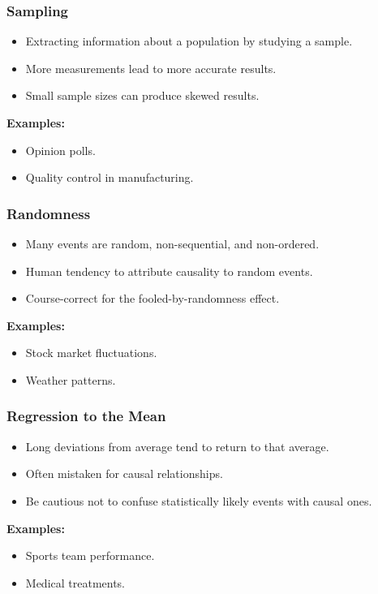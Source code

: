 \begin{frame}[fragile]\frametitle{Sampling}
\begin{itemize}
    \item Extracting information about a population by studying a sample.
    \item More measurements lead to more accurate results.
    \item Small sample sizes can produce skewed results.
\end{itemize}
\textbf{Examples:}
\begin{itemize}
    \item Opinion polls.
    \item Quality control in manufacturing.
\end{itemize}
\end{frame}

\begin{frame}[fragile]\frametitle{Randomness}
\begin{itemize}
    \item Many events are random, non-sequential, and non-ordered.
    \item Human tendency to attribute causality to random events.
    \item Course-correct for the fooled-by-randomness effect.
\end{itemize}
\textbf{Examples:}
\begin{itemize}
    \item Stock market fluctuations.
    \item Weather patterns.
\end{itemize}
\end{frame}

\begin{frame}[fragile]\frametitle{Regression to the Mean}
\begin{itemize}
    \item Long deviations from average tend to return to that average.
    \item Often mistaken for causal relationships.
    \item Be cautious not to confuse statistically likely events with causal ones.
\end{itemize}
\textbf{Examples:}
\begin{itemize}
    \item Sports team performance.
    \item Medical treatments.
\end{itemize}
\end{frame}

